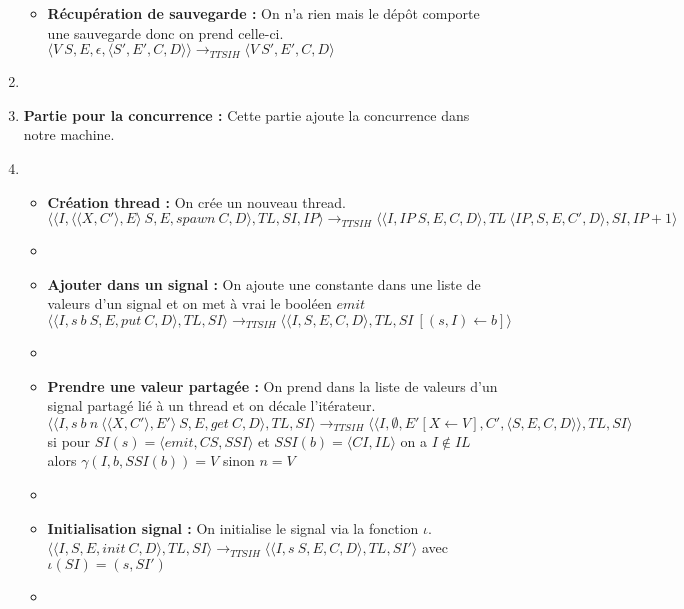 \documentclass[10pt,a4paper]{report}
\begin{document}
\begin{enumerate}
\begin{itemize}
			\item[] \textbf{Récupération de sauvegarde :}  On n'a rien mais le dépôt comporte une sauvegarde donc on prend celle-ci.
			\smallbreak  
			$\langle V~S,E,\epsilon,\langle S',E',C,D\rangle\rangle
			\longrightarrow_{TTSIH} 
			\langle V~S',E',C,D\rangle$
		\end{itemize}
		\item[]
		
		
		
		\item[] \textbf{Partie pour la concurrence :} Cette partie ajoute la concurrence dans notre machine. 
		\item[]
		\begin{itemize}
			\item[]  \textbf{Création thread :} On crée un nouveau thread.
			\smallbreak 
			$\langle\langle I,\langle\langle X,C'\rangle, E\rangle~S,E,spawn~C,D\rangle,TL,SI,IP\rangle 
			\longrightarrow_{TTSIH} 
			\langle\langle I,IP~S,E,C,D\rangle,TL~\langle IP,S,E,C',D\rangle,SI,IP+1\rangle$
			\item[]
			
			\item[] \textbf{Ajouter dans un signal :} On ajoute une constante dans une liste de valeurs d'un signal et on met à vrai le booléen $emit$
			\smallbreak
			$\langle\langle I,s~b~S,E,put~C,D\rangle,TL,SI\rangle
			\longrightarrow_{TTSIH} 
			\langle\langle I,S,E,C,D\rangle,TL,SI~[(s,I) \leftarrow b]\rangle$ 
			\item[]
			
			\item[] \textbf{Prendre une valeur partagée :} On prend dans la liste de valeurs d'un signal partagé lié à un thread et on décale l'itérateur.
			\smallbreak
			$\langle\langle I,s~b~n~\langle\langle X,C'\rangle,E'\rangle~S,E,get~C,D\rangle,TL,SI\rangle 
			\longrightarrow_{TTSIH} 
			\langle\langle I,\emptyset,E'[X \leftarrow V],C',\langle S,E,C,D\rangle\rangle,TL,SI\rangle$
			\\ si pour $SI(s) = \langle emit,CS,SSI\rangle$ et $SSI(b) = \langle CI,IL\rangle$ on a $I \notin IL$ alors $\gamma(I,b,SSI(b)) = V$ sinon $n = V$
			\item[]
			
			\item[] \textbf{Initialisation signal :} On initialise le signal via la fonction $\iota$.
			\smallbreak 
			$\langle\langle I,S,E,init~C,D\rangle,TL,SI\rangle 
			\longrightarrow_{TTSIH}
			\langle\langle I,s~S,E,C,D\rangle,TL,SI'\rangle$
			avec $\iota(SI) = (s,SI')$
			\item[]	
			

\end{itemize}
\end{enumerate}
\end{document}
